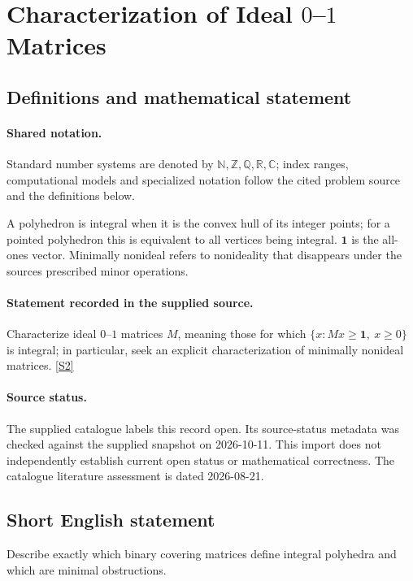 \documentclass[11pt]{article}
\newcommand{\sref}[2]{\hyperlink{source:#1:#2}{[S#2]}}
\begin{document}
\section{Characterization of Ideal $0$–$1$ Matrices}\label{statement}

\subsection{Definitions and mathematical statement}

\paragraph{Shared notation.}Standard number systems are denoted by $\mathbb N,\mathbb Z,\mathbb Q,\mathbb R,\mathbb C$; index ranges, computational models and specialized notation follow the cited problem source and the definitions below.


A polyhedron is integral when it is the convex hull of its integer points; for a pointed polyhedron this is equivalent to all vertices being integral. $\mathbf1$ is the all-ones vector. Minimally nonideal refers to nonideality that disappears under the source\textquotesingle s prescribed minor operations.
\paragraph{Statement recorded in the supplied source.}
Characterize ideal $0$–$1$ matrices $M$, meaning those for which $\{x:Mx\geq\mathbf1,\ x\geq0\}$ is integral; in particular, seek an explicit characterization of minimally nonideal matrices. \sref{statement}{2}
\paragraph{Source status.}
The supplied catalogue labels this record open. Its source-status metadata was checked against the supplied snapshot on 2026-10-11. This import does not independently establish current open status or mathematical correctness. The catalogue literature assessment is dated 2026-08-21.
\subsection{Short English statement}
Describe exactly which binary covering matrices define integral polyhedra and which are minimal obstructions.
\end{document}
